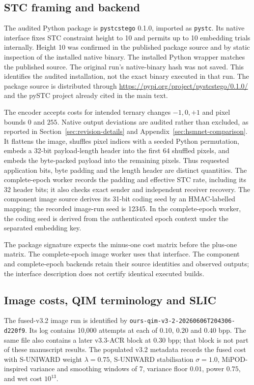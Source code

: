 \documentclass[journal]{IEEEtran}
\theoremstyle{definition}
\theoremstyle{game}
\begin{document}
\subsection{STC framing and backend}
\label{subsec:repro-stc}
The audited Python package is \texttt{pystcstego} 0.1.0, imported as
\texttt{pystc}. Its native interface fixes STC constraint height to 10
and permits up to 10 embedding trials internally. Height 10 was confirmed
in the published package source and by static inspection of the installed
native binary. The installed Python wrapper matches the published source.
The original run's native-binary hash was not saved. This identifies the
audited installation, not the exact binary executed in that run.
The package source is distributed through
\url{https://pypi.org/project/pystcstego/0.1.0/} and the pySTC project
already cited in the main text.

The encoder accepts costs for intended ternary changes $-1,0,+1$ and
pixel bounds $0$ and $255$. Native output deviations are audited rather
than excluded, as reported in Section~\ref{sec:revision-details} and
Appendix~\ref{sec:hsmnet-comparison}. It flattens the image, shuffles pixel indices with a
seeded Python permutation, embeds a 32-bit payload-length header into the
first 64 shuffled pixels, and embeds the byte-packed payload into the
remaining pixels. Thus requested application bits, byte padding and the
length header are distinct quantities. The complete-epoch worker records the
padding and effective STC rate, including its 32 header bits; it also
checks exact sender and independent receiver recovery. The component
image source derives its 31-bit coding seed by an HMAC-labelled mapping;
the recorded image-run seed is 12345. In the complete-epoch worker, the coding
seed is derived from the authenticated epoch context under the separated
embedding key.

The package signature expects the minus-one cost matrix before the
plus-one matrix. The complete-epoch image worker uses that interface. The component and complete-epoch backends retain their source identities
and observed outputs; the interface description does not certify identical
executed builds.

\subsection{Image costs, QIM terminology and SLIC}
\label{subsec:repro-image}
The fused-v3.2 image run is identified by
\nolinkurl{ours-qim-v3-2-20260606T204306-d220f9}.
Its log contains 10,000 attempts at each of $0.10$, $0.20$ and
$0.40$ bpp. The same file also contains a later v3.3-ACR block at
$0.30$ bpp; that block is not part of these manuscript results.
The populated v3.2 metadata records the fused cost with S-UNIWARD
weight $\lambda=0.75$, S-UNIWARD stabilisation $\sigma=1.0$,
MiPOD-inspired variance and smoothing windows of 7, variance floor
$0.01$, power $0.75$, and wet cost $10^{13}$.
\end{document}
